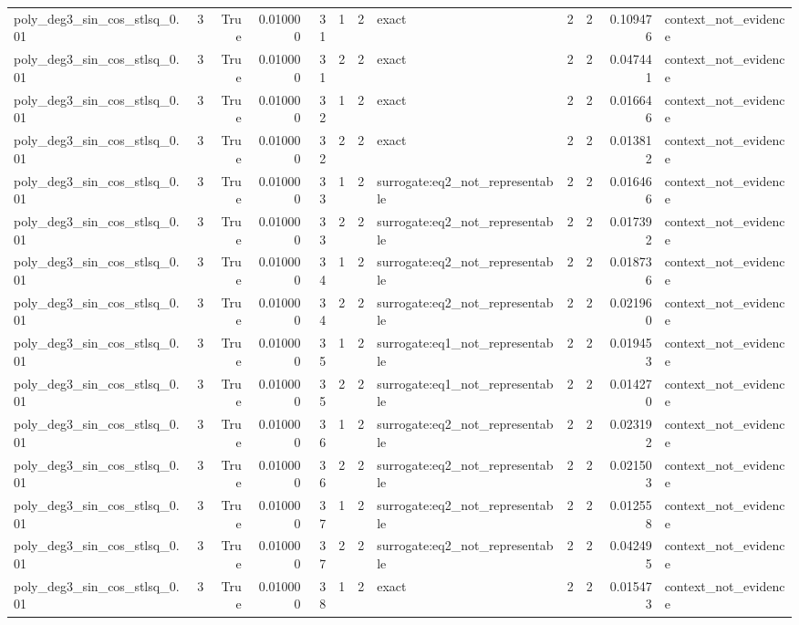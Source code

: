 \begin{tabular}{lrrrrrrlrrrl}
poly\_deg3\_sin\_cos\_stlsq\_0.01 & 3 & True & 0.010000 & 31 & 1 & 2 & exact & 2 & 2 & 0.109476 & context\_not\_evidence \\
poly\_deg3\_sin\_cos\_stlsq\_0.01 & 3 & True & 0.010000 & 31 & 2 & 2 & exact & 2 & 2 & 0.047441 & context\_not\_evidence \\
poly\_deg3\_sin\_cos\_stlsq\_0.01 & 3 & True & 0.010000 & 32 & 1 & 2 & exact & 2 & 2 & 0.016646 & context\_not\_evidence \\
poly\_deg3\_sin\_cos\_stlsq\_0.01 & 3 & True & 0.010000 & 32 & 2 & 2 & exact & 2 & 2 & 0.013812 & context\_not\_evidence \\
poly\_deg3\_sin\_cos\_stlsq\_0.01 & 3 & True & 0.010000 & 33 & 1 & 2 & surrogate:eq2\_not\_representable & 2 & 2 & 0.016466 & context\_not\_evidence \\
poly\_deg3\_sin\_cos\_stlsq\_0.01 & 3 & True & 0.010000 & 33 & 2 & 2 & surrogate:eq2\_not\_representable & 2 & 2 & 0.017392 & context\_not\_evidence \\
poly\_deg3\_sin\_cos\_stlsq\_0.01 & 3 & True & 0.010000 & 34 & 1 & 2 & surrogate:eq2\_not\_representable & 2 & 2 & 0.018736 & context\_not\_evidence \\
poly\_deg3\_sin\_cos\_stlsq\_0.01 & 3 & True & 0.010000 & 34 & 2 & 2 & surrogate:eq2\_not\_representable & 2 & 2 & 0.021960 & context\_not\_evidence \\
poly\_deg3\_sin\_cos\_stlsq\_0.01 & 3 & True & 0.010000 & 35 & 1 & 2 & surrogate:eq1\_not\_representable & 2 & 2 & 0.019453 & context\_not\_evidence \\
poly\_deg3\_sin\_cos\_stlsq\_0.01 & 3 & True & 0.010000 & 35 & 2 & 2 & surrogate:eq1\_not\_representable & 2 & 2 & 0.014270 & context\_not\_evidence \\
poly\_deg3\_sin\_cos\_stlsq\_0.01 & 3 & True & 0.010000 & 36 & 1 & 2 & surrogate:eq2\_not\_representable & 2 & 2 & 0.023192 & context\_not\_evidence \\
poly\_deg3\_sin\_cos\_stlsq\_0.01 & 3 & True & 0.010000 & 36 & 2 & 2 & surrogate:eq2\_not\_representable & 2 & 2 & 0.021503 & context\_not\_evidence \\
poly\_deg3\_sin\_cos\_stlsq\_0.01 & 3 & True & 0.010000 & 37 & 1 & 2 & surrogate:eq2\_not\_representable & 2 & 2 & 0.012558 & context\_not\_evidence \\
poly\_deg3\_sin\_cos\_stlsq\_0.01 & 3 & True & 0.010000 & 37 & 2 & 2 & surrogate:eq2\_not\_representable & 2 & 2 & 0.042495 & context\_not\_evidence \\
poly\_deg3\_sin\_cos\_stlsq\_0.01 & 3 & True & 0.010000 & 38 & 1 & 2 & exact & 2 & 2 & 0.015473 & context\_not\_evidence \\

\end{tabular}
